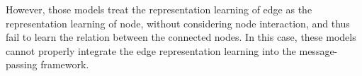 However, those models treat the representation learning of edge as the representation learning of node, without considering node interaction, and thus fail to learn the relation between the connected nodes. 
In this case, these models cannot properly integrate the edge representation learning into the message-passing framework.




